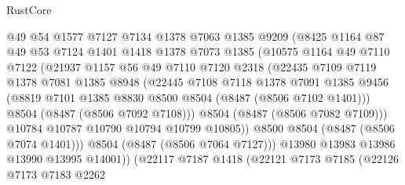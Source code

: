 \begin{lexlean}{RustCore}
\begin{coremodule}
                      @49
                      @54
                      @1577
                      @7127
                      @7134
                      @1378
                      @7063
                      @1385
                      @9209
                      (@8425
                        @1164
                        @87
                        @49
                        @53
                        @7124
                        @1401
                        @1418
                        @1378
                        @7073
                        @1385
                        (@10575
                          @1164
                          @49
                          @7110
                          @7122
                          (@21937
                            @1157
                            @56
                            @49
                            @7110
                            @7120
                            @2318
                            (@22435
                              @7109
                              @7119
                              @1378
                              @7081
                              @1385
                              @8948
                              (@22445
                                @7108
                                @7118
                                @1378
                                @7091
                                @1385
                                @9456
                                (@8819 @7101 @1385 @8830 @8500 @8504 (@8487 (@8506 @7102 @1401)))
                                @8504
                                (@8487 (@8506 @7092 @7108)))
                              @8504
                              (@8487 (@8506 @7082 @7109)))
                            @10784
                            @10787
                            @10790
                            @10794
                            @10799
                            @10805))
                        @8500
                        @8504
                        (@8487 (@8506 @7074 @1401)))
                      @8504
                      (@8487 (@8506 @7064 @7127)))
                    @13980
                    @13983
                    @13986
                    @13990
                    @13995
                    @14001))
                (@22117
                  @7187
                  @1418
                  (@22121
                    @7173
                    @7185
                    (@22126
                      @7173
                      @7183
                      @2262

\end{coremodule}
\end{lexlean}
